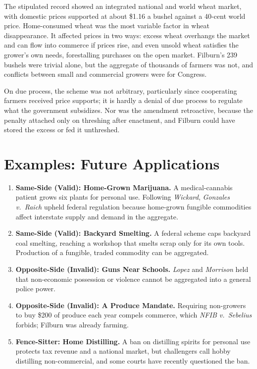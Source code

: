 \documentclass[12pt]{article}
\begin{document}
The stipulated record showed an integrated national and world wheat market, with domestic prices supported at about \$1.16 a bushel against a 40-cent world price. Home-consumed wheat was the most variable factor in wheat disappearance. It affected prices in two ways: excess wheat overhangs the market and can flow into commerce if prices rise, and even unsold wheat satisfies the grower's own needs, forestalling purchases on the open market. Filburn's 239 bushels were trivial alone, but the aggregate of thousands of farmers was not, and conflicts between small and commercial growers were for Congress.

On due process, the scheme was not arbitrary, particularly since cooperating farmers received price supports; it is hardly a denial of due process to regulate what the government subsidizes. Nor was the amendment retroactive, because the penalty attached only on threshing after enactment, and Filburn could have stored the excess or fed it unthreshed.

\section{Examples: Future Applications}

\begin{enumerate}
\item \textbf{Same-Side (Valid): Home-Grown Marijuana.} A medical-cannabis patient grows six plants for personal use. Following \textit{Wickard}, \textit{Gonzales v.\ Raich} upheld federal regulation because home-grown fungible commodities affect interstate supply and demand in the aggregate.
\item \textbf{Same-Side (Valid): Backyard Smelting.} A federal scheme caps backyard coal smelting, reaching a workshop that smelts scrap only for its own tools. Production of a fungible, traded commodity can be aggregated.
\item \textbf{Opposite-Side (Invalid): Guns Near Schools.} \textit{Lopez} and \textit{Morrison} held that non-economic possession or violence cannot be aggregated into a general police power.
\item \textbf{Opposite-Side (Invalid): A Produce Mandate.} Requiring non-growers to buy \$200 of produce each year compels commerce, which \textit{NFIB v.\ Sebelius} forbids; Filburn was already farming.
\item \textbf{Fence-Sitter: Home Distilling.} A ban on distilling spirits for personal use protects tax revenue and a national market, but challengers call hobby distilling non-commercial, and some courts have recently questioned the ban.
\end{enumerate}
\end{document}
